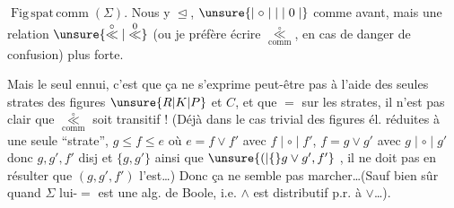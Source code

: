 
 $\operatorname{Fig\,spat\,comm}(\Sigma)$. Nous y  $\trianglelefteq$, $\unsure{\mid\circ\mid|\mid0\mid}$ comme avant, mais une relation $\unsure{\overset{\circ}{\ll}|\overset{0}{\ll}}$ (ou je préfère écrire $\underset{\mathrm{comm}}{\overset{\circ}{\ll}}$, en cas de danger de confusion) plus forte.

Mais le seul ennui, c'est que ça ne  s'exprime peut-être pas à l'aide des seules strates des figures $\unsure{R|K|P}$ et $C$, et que $=$ sur les strates, il n'est pas clair que $\underset{\mathrm{comm}}{\overset{\circ}{\ll}}$ soit transitif ! (Déjà dans le cas trivial des figures él. réduites à une seule ``strate'',  $g\leq f\leq e$ où $e=f\vee f'$ avec $f\mid\circ\mid f'$, $f=g\vee g'$ avec $g\mid\circ\mid g'$ donc  $g,g',f'$  disj et  $\{g,g'\}$ ainsi que $\unsure{(|\{}g\vee g',f'\}$ , il ne doit pas en résulter que $(g,g',f')$ l'est\ldots) Donc ça ne semble pas marcher\ldots (Sauf bien sûr quand $\Sigma$ lui-$=$ est une alg. de Boole, i.e. $\wedge$ est distributif p.r. à $\vee$\ldots).
